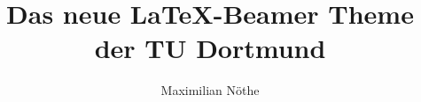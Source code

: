 \documentclass{beamer}
\title{Das neue \LaTeX-Beamer Theme der TU Dortmund}
\author{Maximilian Nöthe}
\institute{Lehrstuhl E5b \\Fakultät Physik}
\begin{document}
\begin{frame}
    \titlepage
\end{frame}
\end{document}
